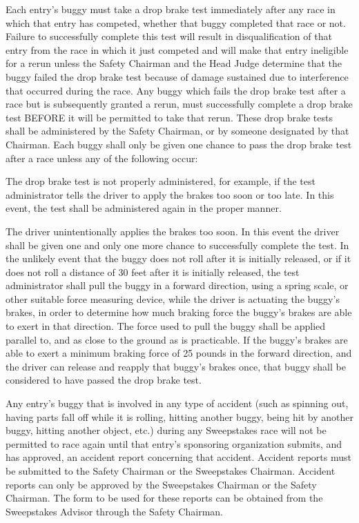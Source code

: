 \documentclass[openany]{book}
\begin{document}
Each entry's buggy must take a drop brake test immediately after any race in which that entry has competed, whether that buggy completed that race or not. Failure to successfully complete this test will result in disqualification of that entry from the race in which it just competed and will make that entry ineligible for a rerun unless the Safety Chairman and the Head Judge determine that the buggy failed the drop brake test because of damage sustained due to interference that occurred during the race. Any buggy which fails the drop brake test after a race but is subsequently granted a rerun, must successfully complete a drop brake test BEFORE it will be permitted to take that rerun. These drop brake tests shall be administered by the Safety Chairman, or by someone designated by that Chairman. Each buggy shall only be given one chance to pass the drop brake test after a race unless any of the following occur:

The drop brake test is not properly administered, for example, if the test administrator tells the driver to apply the brakes too soon or too late. In this event, the test shall be administered again in the proper manner.

The driver unintentionally applies the brakes too soon. In this event the driver shall be given one and only one more chance to successfully complete the test. In the unlikely event that the buggy does not roll after it is initially released, or if it does not roll a distance of 30 feet after it is initially released, the test administrator shall pull the buggy in a forward direction, using a spring scale, or other suitable force measuring device, while the driver is actuating the buggy's brakes, in order to determine how much braking force the buggy's brakes are able to exert in that direction. The force used to pull the buggy shall be applied parallel to, and as close to the ground as is practicable. If the buggy's brakes are able to exert a minimum braking force of 25 pounds in the forward direction, and the driver can release and reapply that buggy's brakes once, that buggy shall be considered to have passed the drop brake test.

Any entry's buggy that is involved in any type of accident (such as spinning out, having parts fall off while it is rolling, hitting another buggy, being hit by another buggy, hitting another object, etc.) during any Sweepstakes race will not be permitted to race again until that entry's sponsoring organization submits, and has approved, an accident report concerning that accident. Accident reports must be submitted to the Safety Chairman or the Sweepstakes Chairman. Accident reports can only be approved by the Sweepstakes Chairman or the Safety Chairman. The form to be used for these reports can be obtained from the Sweepstakes Advisor through the Safety Chairman.
\end{document}
